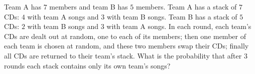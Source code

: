Team A has $7$ members and team B has $5$ members. Team A has a stack of $7$ CDs: $4$ with team A songs and $3$ with team B songs. Team B has a stack of $5$ CDs: $2$ with team B songs and $3$ with team A songs. In each round, each team's CDs are dealt out at random, one to each of its members; then one member of each team is chosen at random, and these two members swap their CDs; finally all CDs are returned to their team's stack. What is the probability that after $3$ rounds each stack contains only its own team's songs?
